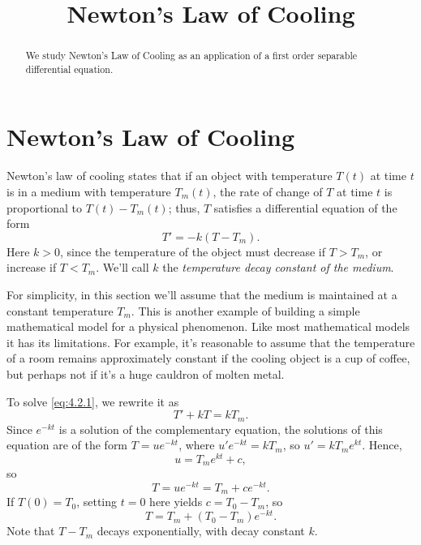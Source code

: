 \documentclass{ximera}
\title{Newton's Law of Cooling}
\begin{document}
 
\begin{abstract}
 We study Newton's Law of Cooling as an application of a first order separable differential equation.
\end{abstract}
 
\maketitle
 
 
 
\section*{Newton's Law of Cooling}
 
Newton's law of cooling states that if an object with temperature
$T(t)$ at time $t$ is in a medium with temperature $T_m(t)$,  the
rate of change of $T$ at time $t$ is proportional to $T(t)-T_m(t)$;
thus,
$T$ satisfies a differential equation of the form
\begin{equation} \label{eq:4.2.1}
T'=-k(T-T_m).
\end{equation}
 Here $k > 0$, since the temperature of the object must decrease if
$T > T_m$, or increase if $T < T_m$.  We'll call $k$  the \textit{temperature decay constant of the medium}.
 
For simplicity, in this section we'll assume  that the medium is
maintained at a constant temperature $T_m$. This is another example of
 building a simple mathematical model for a physical
phenomenon. Like most mathematical models it has its limitations. For
example, it's reasonable to assume that the temperature of a room
remains approximately constant if the cooling object is a cup of
coffee, but perhaps not if it's a huge cauldron of molten metal.
 
 
To solve  \eqref{eq:4.2.1}, we rewrite it as
$$
T'+kT=kT_m.
$$
Since $e^{-kt}$ is a solution of the complementary equation, the
solutions of this equation are of the form $T=ue^{-kt}$, where
$u'e^{-kt}=kT_m$, so $u'=kT_me^{kt}$. Hence,
$$
u=T_me^{kt}+c,
$$
so
$$
T=ue^{-kt}=T_m+ce^{-kt}.
$$
If $T(0)=T_0$,  setting $t=0$ here yields $c=T_0-T_m$, so
\begin{equation} \label{eq:4.2.2}
T=T_m+(T_0-T_m)e^{-kt}.
\end{equation}
Note that $T-T_m$ decays exponentially, with decay constant $k$.
 
\end{document}
